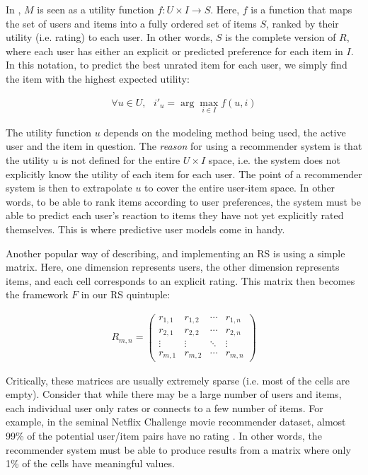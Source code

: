 In \cite{Adomavicius2005}, $M$ is seen as a utility function
$f: U \times I \rightarrow S$. Here, $f$ is a function that maps the set
of users and items into a fully ordered set of items $S$, ranked by their
utility (i.e. rating) to each user. In other words, $S$ is the complete version of $R$,
where each user has either an explicit or predicted preference for each item in $I$.
In this notation, to predict the best unrated item for each user, we simply find the item with the highest expected utility:

\begin{eqnarray*}
  \forall u \in U,\text{ } i'_u = \arg\max_{i \in I} f(u,i)
\end{eqnarray*}

The utility function $u$ depends on the modeling method being used, the active user and the item in question. 
The \emph{reason} for using a recommender system is that the utility $u$ is not defined for the entire $U \times I$ space, 
i.e. the system does not explicitly know the utility of each item for each user. 
The point of a recommender system is then to extrapolate $u$ to cover the entire user-item space. 
In other words, to be able to rank items according to user preferences, 
the system must be able to predict each user's reaction to items they have not yet explicitly rated themselves. 
This is where predictive user models come in handy.

Another popular way of describing, and implementing an RS is using a simple matrix. 
Here, one dimension represents users, the other dimension represents items,
and each cell corresponds to an explicit rating. This matrix then becomes the framework $F$ in our 
RS quintuple:

\begin{eqnarray*}
 R_{m,n} =
 \begin{pmatrix}
  r_{1,1} & r_{1,2} & \cdots & r_{1,n} \\
  r_{2,1} & r_{2,2} & \cdots & r_{2,n} \\
  \vdots  & \vdots  & \ddots & \vdots  \\
  r_{m,1} & r_{m,2} & \cdots & r_{m,n}
 \end{pmatrix}
\end{eqnarray*}

Critically, these matrices are usually extremely sparse (i.e. most of the cells are empty). 
Consider that while there may be a large number of users and items, each individual user
only rates or connects to a few number of items. 
For example, in the seminal Netflix Challenge movie recommender dataset, almost 99\% of the potential
user/item pairs have no rating \citep[p1]{Bell2007d}. In other words, the recommender system must be able
to produce results from a matrix where only 1\% of the cells have meaningful values.


